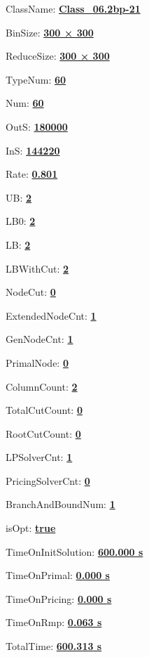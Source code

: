 \documentclass[11pt]{article}
\begin{document}
\pagestyle{empty}


ClassName: \underline{\textbf{Class_06.2bp-21}}
\par
BinSize: \underline{\textbf{300 × 300}}
\par
ReduceSize: \underline{\textbf{300 × 300}}
\par
TypeNum: \underline{\textbf{60}}
\par
Num: \underline{\textbf{60}}
\par
OutS: \underline{\textbf{180000}}
\par
InS: \underline{\textbf{144220}}
\par
Rate: \underline{\textbf{0.801}}
\par
UB: \underline{\textbf{2}}
\par
LB0: \underline{\textbf{2}}
\par
LB: \underline{\textbf{2}}
\par
LBWithCut: \underline{\textbf{2}}
\par
NodeCut: \underline{\textbf{0}}
\par
ExtendedNodeCnt: \underline{\textbf{1}}
\par
GenNodeCnt: \underline{\textbf{1}}
\par
PrimalNode: \underline{\textbf{0}}
\par
ColumnCount: \underline{\textbf{2}}
\par
TotalCutCount: \underline{\textbf{0}}
\par
RootCutCount: \underline{\textbf{0}}
\par
LPSolverCnt: \underline{\textbf{1}}
\par
PricingSolverCnt: \underline{\textbf{0}}
\par
BranchAndBoundNum: \underline{\textbf{1}}
\par
isOpt: \underline{\textbf{true}}
\par
TimeOnInitSolution: \underline{\textbf{600.000 s}}
\par
TimeOnPrimal: \underline{\textbf{0.000 s}}
\par
TimeOnPricing: \underline{\textbf{0.000 s}}
\par
TimeOnRmp: \underline{\textbf{0.063 s}}
\par
TotalTime: \underline{\textbf{600.313 s}}
\par
\newpage
\end{document}
